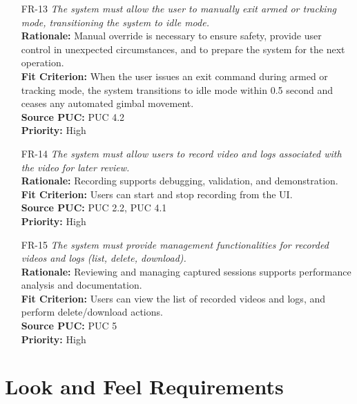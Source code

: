 \documentclass[12pt]{article}
\begin{document}
\begin{itemize}
  \item[FR-13] \emph{The system must allow the user to manually exit armed or tracking
          mode, transitioning the system to idle mode.}\\[2mm]
        {\bf Rationale:} Manual override is necessary to ensure safety, provide user control in unexpected circumstances, and to prepare the system for the next operation.\\
        {\bf Fit Criterion:} When the user issues an exit command during armed or tracking mode, the system transitions to idle mode within 0.5 second and ceases any automated gimbal movement.\\
        {\bf Source PUC:} PUC 4.2 \\
        {\bf Priority:} High

  \item[FR-14] \emph{The system must allow users to record video and logs associated
          with the video for later review.}\\[2mm]
        {\bf Rationale:} Recording supports debugging, validation, and demonstration.\\
        {\bf Fit Criterion:} Users can start and stop recording from the UI.\\
        {\bf Source PUC:} PUC 2.2, PUC 4.1 \\
        {\bf Priority:} High

  \item[FR-15] \emph{The system must provide management functionalities for recorded
          videos and logs (list, delete, download).}\\[2mm]
        {\bf Rationale:} Reviewing and managing captured sessions supports performance analysis and documentation.\\
        {\bf Fit Criterion:} Users can view the list of recorded videos and logs, and perform delete/download actions.\\
        {\bf Source PUC:} PUC 5 \\
        {\bf Priority:} High

\end{itemize}
\section{Look and Feel Requirements}
\end{document}
